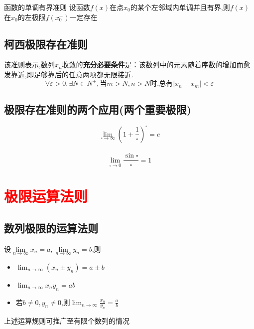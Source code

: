 \documentclass[12pt, a4paper, oneside, UTF8]{ctexbook}  %
\begin{document}
\begin{them}{函数的单调有界准则}{}
    设函数$f(x)$在点$x_0$的某个左邻域内单调并且有界,则$f(x)$在$x_0$的左极限$f(x_0^-)$一定存在
\end{them}
\subsection{柯西极限存在准则}
该准则表示,数列${x_n}$收敛的\textbf{充分必要条件}是：该数列中的元素随着序数的增加而愈发靠近,即足够靠后的任意两项都无限接近.
$$
    \forall \varepsilon >0 ,\exists N \in N^+,\text{当}m>N,n>N\text{时}.\text{总有}|x_n-x_m|<\varepsilon
$$
\subsection{极限存在准则的两个应用(两个重要极限)}
$$
    \lim _ { \square \rightarrow \infty } ( 1 + \frac { 1 } { \square } ) ^ { \square } = e
$$
\\
$$
    \lim _ { \square \rightarrow 0 } \frac { \sin \square } { \square } = 1
$$
\section{\textcolor{red}{极限运算法则}}

\subsection{数列极限的运算法则}
设$\underset{n\to\infty}{\operatorname*{lim}}x_{n}=a,\underset{n\to\infty}{\operatorname*{lim}}y_{n}=b$,则
\begin{itemize}
    \item $\operatorname*{lim}_{n\to\infty}(x_n\pm y_n)=a\pm b$
    \item $\lim_{n\to\infty}x_{n}y_{n}=ab$
    \item 若$b \neq 0,y_n \neq 0$,则$\lim_{n\to\infty}\frac{x_n}{y_n}=\frac{a}{b}$
\end{itemize}
上述运算规则可推广至有限个数列的情况
\end{document}
